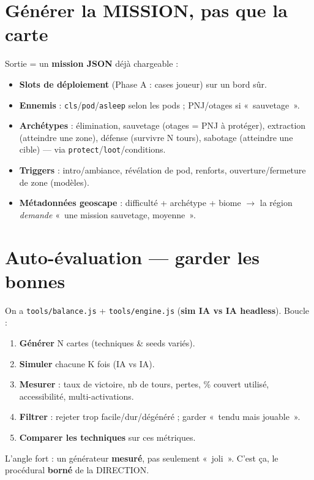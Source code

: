 \documentclass[11pt,a4paper]{article}
\begin{document}
\section{Générer la MISSION, pas que la carte}
Sortie = un \textbf{mission JSON} déjà chargeable :
\begin{itemize}
\item \textbf{Slots de déploiement} (Phase A : cases joueur) sur un bord sûr.
\item \textbf{Ennemis} : \texttt{cls}/\texttt{pod}/\texttt{asleep} selon les pods ; PNJ/otages si «~sauvetage~».
\item \textbf{Archétypes} : élimination, sauvetage (otages = PNJ à protéger), extraction (atteindre une zone), défense (survivre N tours), sabotage (atteindre une cible) --- via \texttt{protect}/\texttt{loot}/conditions.
\item \textbf{Triggers} : intro/ambiance, révélation de pod, renforts, ouverture/fermeture de zone (modèles).
\item \textbf{Métadonnées geoscape} : difficulté + archétype + biome $\to$ la région \emph{demande} «~une mission sauvetage, moyenne~».
\end{itemize}

\section{Auto-évaluation --- garder les bonnes}
On a \texttt{tools/balance.js} + \texttt{tools/engine.js} (\textbf{sim IA vs IA headless}). Boucle :
\begin{enumerate}
\item \textbf{Générer} N cartes (techniques \& seeds variés).
\item \textbf{Simuler} chacune K fois (IA vs IA).
\item \textbf{Mesurer} : taux de victoire, nb de tours, pertes, \% couvert utilisé, accessibilité, multi-activations.
\item \textbf{Filtrer} : rejeter trop facile/dur/dégénéré ; garder «~tendu mais jouable~».
\item \textbf{Comparer les techniques} sur ces métriques.
\end{enumerate}
\begin{keybox}
L'angle fort : un générateur \textbf{mesuré}, pas seulement «~joli~». C'est ça, le procédural \textbf{borné} de la DIRECTION.
\end{keybox}
\end{document}

